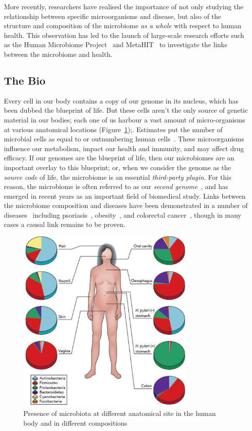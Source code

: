 \begin{justify}
More recently, researchers have realised the importance of not only studying the relationship between specific microorganisms and disease, but also of the structure and composition of the microbiome \emph{as a whole} with respect to human health. This observation has led to the launch of large-scale research efforts such as the Human Microbiome Project~\cite{turnbaugh2007human} and MetaHIT~\cite{ehrlich2011metahit} to investigate the links between the microbiome and health.


\subsection{The Bio}

Every cell in our body contains a copy of our genome in its nucleus, which has been dubbed the blueprint of life. But these cells aren't the only source of genetic material in our bodies; each one of us harbour a vast amount of micro-organisms at various anatomical locations (Figure~\ref{fig:microbiome});. Estimates put the number of microbial cells as equal to or outnumbering human cells~\cite{sender2016outnumbered}. These microorganisms influence our metabolism, impact our health and immunity, and may affect drug efficacy. If our genomes are the blueprint of life, then our microbiomes are an important overlay to this blueprint; or, when we consider the genome as the \emph{source code} of life, the microbiome is an essential \emph{third-party plugin}. For this reason, the microbiome is often referred to as our \emph{second genome}~\cite{grice2012microbiome}, and has emerged in recent years as an important field of biomedical study. Links between the microbiome composition and diseases have been demonstrated in a number of diseases~\cite{cho2012human} including psoriasis~\cite{gao2008substantial}, obesity~\cite{turnbaugh2006obesity, ley2005obesity}, and colorectal cancer~\cite{castellarin2012fusobacterium,kostic2012genomic}, though in many cases a causal link remains to be proven.

\begin{figure}[h!]
    \centering
    \includegraphics[width=250pt]{chapters/images/mycrobiota/microbiome.jpg}
    \caption{Presence of microbiota at different anatomical site in the human body and in different compositions}
    \label{fig:microbiome}
\end{figure}


\end{justify}
